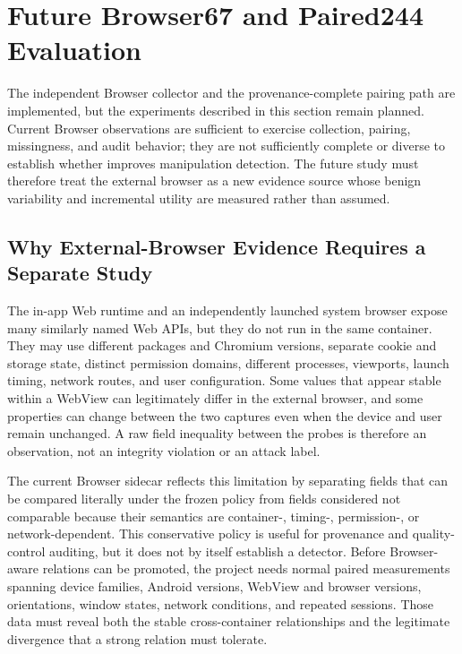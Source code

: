 \section{Future Browser67 and Paired244 Evaluation}
\label{sec:browser-future}

The independent Browser collector and the provenance-complete pairing path are implemented, but the experiments described in this section remain planned. Current Browser observations are sufficient to exercise collection, pairing, missingness, and audit behavior; they are not sufficiently complete or diverse to establish whether \browserfp improves manipulation detection. The future study must therefore treat the external browser as a new evidence source whose benign variability and incremental utility are measured rather than assumed.

\subsection{Why External-Browser Evidence Requires a Separate Study}

The in-app Web runtime and an independently launched system browser expose many similarly named Web APIs, but they do not run in the same container. They may use different packages and Chromium versions, separate cookie and storage state, distinct permission domains, different processes, viewports, launch timing, network routes, and user configuration. Some values that appear stable within a WebView can legitimately differ in the external browser, and some properties can change between the two captures even when the device and user remain unchanged. A raw field inequality between the probes is therefore an observation, not an integrity violation or an attack label.

The current Browser sidecar reflects this limitation by separating fields that can be compared literally under the frozen policy from fields considered not comparable because their semantics are container-, timing-, permission-, or network-dependent. This conservative policy is useful for provenance and quality-control auditing, but it does not by itself establish a detector. Before Browser-aware relations can be promoted, the project needs normal paired measurements spanning device families, Android versions, WebView and browser versions, orientations, window states, network conditions, and repeated sessions. Those data must reveal both the stable cross-container relationships and the legitimate divergence that a strong relation must tolerate.

